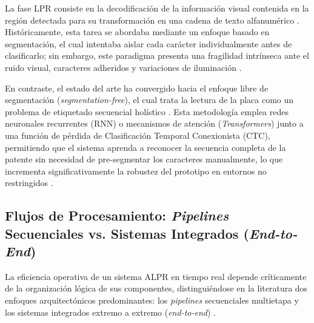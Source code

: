La fase LPR consiste en la decodificación de la información visual contenida en la 
región detectada para su transformación en una cadena de texto alfanumérico 
\parencite{kuyunsaDeepLearningEnhancedAutomatic2025, wijayaEfficientLicensePlate2024}. 
Históricamente, esta tarea se abordaba mediante un enfoque basado en segmentación, 
el cual intentaba aislar cada carácter individualmente antes de clasificarlo; sin 
embargo, este paradigma presenta una fragilidad intrínseca ante el ruido visual, 
caracteres adheridos y variaciones de iluminación 
\parencite{sonnaraEfficientRealtimeLicense2025, xiongLicensePlateRecognition2026, 
zherzdevLPRNetLicensePlate2018}.

En contraste, el estado del arte ha convergido hacia el enfoque libre de segmentación 
(\textit{segmentation-free}), el cual trata la lectura de la placa como un problema de 
etiquetado secuencial holístico 
\parencite{kuyunsaDeepLearningEnhancedAutomatic2025, sonnaraEfficientRealtimeLicense2025, 
zherzdevLPRNetLicensePlate2018}. 
Esta metodología emplea redes neuronales recurrentes (RNN) o mecanismos de atención 
(\textit{Transformers}) junto a una función de pérdida de Clasificación Temporal 
Conexionista (CTC), permitiendo que el sistema aprenda a reconocer la secuencia completa 
de la patente sin necesidad de pre-segmentar los caracteres manualmente, lo que incrementa 
significativamente la robustez del prototipo en entornos no restringidos 
\parencite{PDFRealTimeLicense2026, kuyunsaDeepLearningEnhancedAutomatic2025, 
mobeenRealTimeAutomaticLicense2026, zherzdevLPRNetLicensePlate2018}.

\subsection{Flujos de Procesamiento: \textit{Pipelines} Secuenciales vs. Sistemas Integrados (\textit{End-to-End})}

La eficiencia operativa de un sistema ALPR en tiempo real depende críticamente de la 
organización lógica de sus componentes, distinguiéndose en la literatura dos enfoques 
arquitectónicos predominantes: los \textit{pipelines} secuenciales multietapa y los 
sistemas integrados extremo a extremo (\textit{end-to-end}) 
\parencite{xuDeepLearningAlgorithms2026c, sonnaraEfficientRealtimeLicense2025}.

